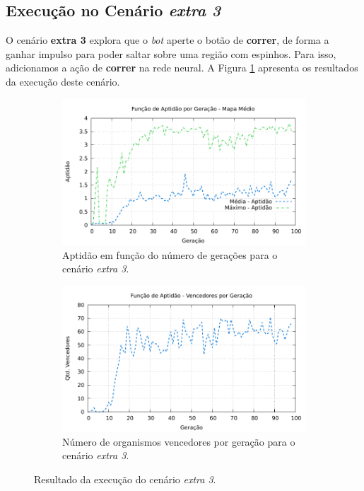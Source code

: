 \subsection{\label{section:experiment-extra3}Execução no Cenário \textit{extra
3}}

O cenário \textbf{extra 3} explora que o \textit{bot} aperte o botão de
\textbf{correr}, de forma a ganhar impulso para poder saltar sobre uma região
com espinhos. Para isso, adicionamos a ação de \textbf{correr} na rede neural.
A Figura \ref{fig:extra3-results} apresenta os resultados da execução deste
cenário.

\begin{figure}[H]
\centering
	\begin{subfigure}[b]{0.4\textwidth}
        \includegraphics[width=\textwidth]{fig/extra3-fitness.pdf}
        \caption{Aptidão em função do número de gerações para o cenário
        \textit{extra 3}.}
	\end{subfigure}
	\begin{subfigure}[b]{0.4\textwidth}
        \includegraphics[width=\textwidth]{fig/extra3-winners.pdf}
        \caption{Número de organismos vencedores por geração para o cenário
        \textit{extra 3}.}
	\end{subfigure}

    \caption{Resultado da execução do cenário \textit{extra 3}.}
	\label{fig:extra3-results}
\end{figure}

